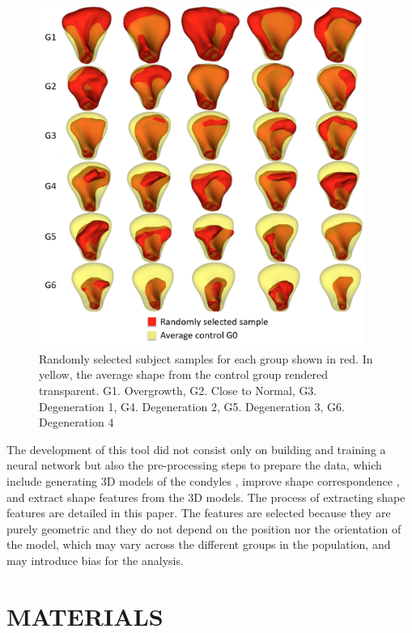 \documentclass[]{spie}  %
\begin{document}
\begin{figure}
\centering 
    \includegraphics[width=0.95\textwidth]{ShapeGroupsSVA.png}
    \caption{Randomly selected subject samples for each group shown in red. In yellow, the average shape from the control group rendered transparent. G1. Overgrowth, G2. Close to Normal, G3. Degeneration 1, G4. Degeneration 2, G5. Degeneration 3, G6. Degeneration 4}
    \label{fig:shapeGroups}
\end{figure} 

The development of this tool did not consist only on building and training a neural network but also
the pre-processing steps to prepare the data, which include generating 3D models of the condyles \cite{PANIAGUA2011345}, improve shape correspondence \cite{lyu2013group}, and extract shape features from the 3D models. The process of extracting
shape features are detailed in this paper. 
The features are selected because they are purely geometric and they do not depend on the position 
nor the orientation of the model, which may vary across the different groups in the population, 
and may introduce bias for the analysis.

\section{MATERIALS}
\end{document}
